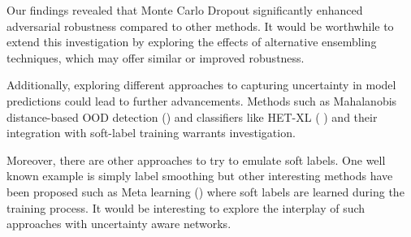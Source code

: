 \documentclass{article}
\begin{document}
Our findings revealed that Monte Carlo Dropout significantly enhanced adversarial robustness compared to other methods. It would be worthwhile to extend this investigation by exploring the effects of alternative ensembling techniques, which may offer similar or improved robustness.

Additionally, exploring different approaches to capturing uncertainty in model predictions could lead to further advancements. Methods such as Mahalanobis distance-based OOD detection (\cite{anthony2023usemahalanobisdistanceoutofdistribution}) and classifiers like HET-XL (\cite{collier2023massivelyscalingheteroscedasticclassifiers}
) and their integration with soft-label training warrants investigation.

Moreover, there are other approaches to try to emulate soft labels. One well known example is simply label smoothing but other interesting methods have been proposed such as Meta learning (\cite{vyas2020learningsoftlabelsmeta}) where soft labels are learned during the training process. It would be interesting to explore the interplay of such approaches with uncertainty aware networks. 
\appendix
\end{document}
